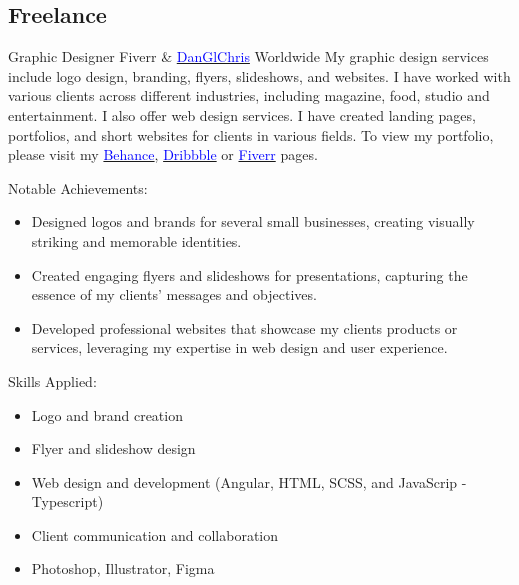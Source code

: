 \subsection{\textbf{Freelance}}

    {Graphic Designer}
    {Fiverr \& \href{https://danglchris.netlify.app/}{\textcolor{blue}{DanGlChris}}}
    {Worldwide}
    {
    \newline
    My graphic design services include logo design, branding, flyers, slideshows, and websites. I have worked with various clients across different industries, including magazine, food, studio and entertainment. 
    \newline
    I also offer web design services. I have created landing pages, portfolios, and short websites for clients in various fields.
    To view my portfolio, please visit my \href{https://www.behance.net/kankwandadaglox}{\textcolor{blue}{Behance}}, \href{https://dribbble.com/DanGlChris}{\textcolor{blue}{Dribbble}} or 
    \href{https://www.fiverr.com/danglchris/design-in-one-day-a-professional-creative-minimalist-logo-634d?utm_campaign=gigs_show&utm_medium=shared&utm_source=copy_link&utm_term=plvgj8}{\textcolor{blue}{Fiverr}} pages.
    } 
    {\newline
    Notable Achievements:
    \begin{itemize}
        \item Designed logos and brands for several small businesses, creating visually striking and memorable identities.
        \item Created engaging flyers and slideshows for presentations, capturing the essence of my clients' messages and objectives.
        \item Developed professional websites that showcase my clients products or services, leveraging my expertise in web design and user experience.
    \end{itemize}
    \vspace{1mm}
    Skills Applied:
    \begin{itemize}
        \item Logo and brand creation
        \item Flyer and slideshow design
        \item Web design and development (Angular, HTML, SCSS, and JavaScrip - Typescript)
        \item Client communication and collaboration
        \item Photoshop, Illustrator, Figma
    \end{itemize}
    \vspace{1mm}
    }

